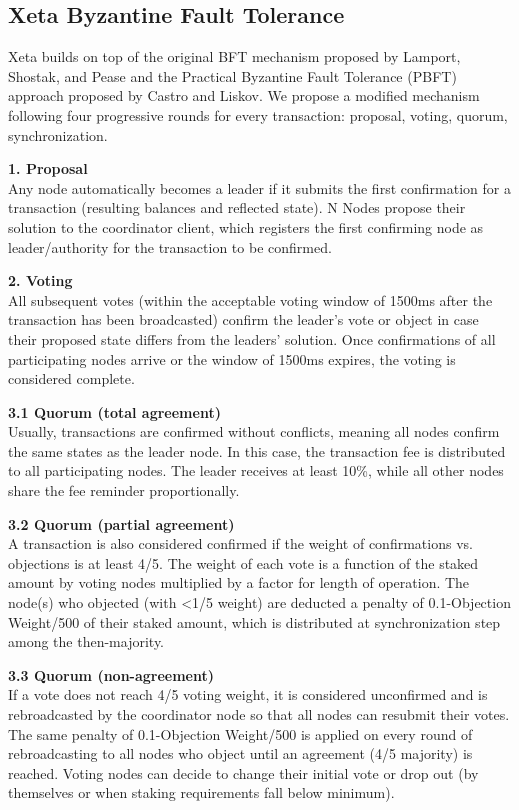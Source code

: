 \documentclass{article}
\begin{document}
\subsection{Xeta Byzantine Fault Tolerance}
Xeta builds on top of the original BFT mechanism proposed by Lamport, Shostak, and Pease and the Practical Byzantine Fault Tolerance (PBFT) approach proposed by Castro and Liskov. We propose a modified mechanism following four progressive rounds for every transaction: proposal, voting, quorum, synchronization.
\bigskip

\textbf{1. Proposal}\\
Any node automatically becomes a leader if it submits the first confirmation for a transaction (resulting balances and reflected state). N Nodes propose their solution to the coordinator client, which registers the first confirming node as leader/authority for the transaction to be confirmed.
\bigskip

\textbf{2. Voting}\\
All subsequent votes (within the acceptable voting window of 1500ms after the transaction has been broadcasted) confirm the leader's vote or object in case their proposed state differs from the leaders' solution. Once confirmations of all participating nodes arrive or the window of 1500ms expires, the voting is considered complete.
\bigskip

\textbf{3.1 Quorum (total agreement)}\\
Usually, transactions are confirmed without conflicts, meaning all nodes confirm the same states as the leader node. In this case, the transaction fee is distributed to all participating nodes. The leader receives at least 10\%, while all other nodes share the fee reminder proportionally.
\bigskip

\textbf{3.2 Quorum (partial agreement)}\\
A transaction is also considered confirmed if the weight of confirmations vs. objections is at least 4/5. The weight of each vote is a function of the staked amount by voting nodes multiplied by a factor for length of operation. The node(s) who objected (with <1/5 weight) are deducted a penalty of 0.1-Objection Weight/500 of their staked amount, which is distributed at synchronization step among the then-majority.
\bigskip

\textbf{3.3 Quorum (non-agreement)}\\
If a vote does not reach 4/5 voting weight, it is considered unconfirmed and is rebroadcasted by the coordinator node so that all nodes can resubmit their votes. The same penalty of 0.1-Objection Weight/500 is applied on every round of rebroadcasting to all nodes who object until an agreement (4/5 majority) is reached. Voting nodes can decide to change their initial vote or drop out (by themselves or when staking requirements fall below minimum).
\bigskip
\end{document}

